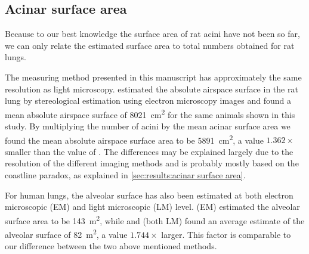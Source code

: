 \documentclass[final,paper=a4,DIV=calc,abstract,english]{scrartcl}
\newcommand{\meanairspacesurface}{5891} %
\newcommand{\airspacedifference}{1.362\xspace} %
\begin{document}
\subsection{Acinar surface area}

Because to our best knowledge the surface area of rat acini have not been  so far, we can only relate the estimated surface area to total numbers obtained for rat lungs.

The measuring method presented in this manuscript has approximately the same resolution as light microscopy.
\citet{Tschanz2003} estimated the absolute airspace surface in the rat lung by stereological estimation using electron microscopy images and found a mean absolute airspace surface of \SI{8021}{\centi\meter\squared} for the same animals shown in this study.
By multiplying the number of acini by the mean acinar surface area we found the mean absolute airspace surface area to be \SI{\meanairspacesurface}{\centi\meter\squared}, a value \(\airspacedifference\times\) smaller than the value of \citeauthor{Tschanz2003}.
The differences may be explained largely due to the resolution of the different imaging methods and is probably mostly based on the coastline paradox, as explained in \autoref{sec:results:acinar surface area}.

For human lungs, the alveolar surface has also been estimated at both electron microscopic (EM) and light microscopic (LM) level.
\citet{Gehr1978} (EM) estimated the alveolar surface area to be \SI{143}{\square\meter}, while \citet{Weibel1963} and \citet{Thurlbeck1967} (both LM) found an average estimate of the alveolar surface of \SI{82}{\square\meter}, a value \(1.744\times\) larger.
This factor is comparable to our difference between the two above mentioned methods.
\end{document}
